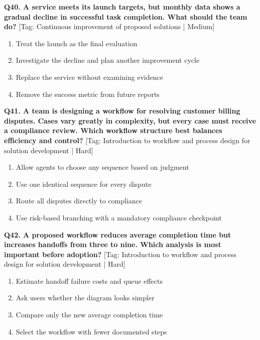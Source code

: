 \noindent\textbf{Q40. A service meets its launch targets, but monthly data shows a gradual decline in successful task completion. What should the team do?} \hfill [Tag: Continuous improvement of proposed solutions | Medium]
\begin{enumerate}[label=(\alph*),topsep=2pt,itemsep=1pt,partopsep=0pt,parsep=0pt]
    \item {Treat the launch as the final evaluation}
    \item {Investigate the decline and plan another improvement cycle}
    \item {Replace the service without examining evidence}
    \item {Remove the success metric from future reports}
\end{enumerate}
\vspace{2mm}

\noindent\textbf{Q41. A team is designing a workflow for resolving customer billing disputes. Cases vary greatly in complexity, but every case must receive a compliance review. Which workflow structure best balances efficiency and control?} \hfill [Tag: Introduction to workflow and process design for solution development | Hard]
\begin{enumerate}[label=(\alph*),topsep=2pt,itemsep=1pt,partopsep=0pt,parsep=0pt]
    \item {Allow agents to choose any sequence based on judgment}
    \item {Use one identical sequence for every dispute}
    \item {Route all disputes directly to compliance}
    \item {Use risk-based branching with a mandatory compliance checkpoint}
\end{enumerate}
\vspace{2mm}

\noindent\textbf{Q42. A proposed workflow reduces average completion time but increases handoffs from three to nine. Which analysis is most important before adoption?} \hfill [Tag: Introduction to workflow and process design for solution development | Hard]
\begin{enumerate}[label=(\alph*),topsep=2pt,itemsep=1pt,partopsep=0pt,parsep=0pt]
    \item {Estimate handoff failure costs and queue effects}
    \item {Ask users whether the diagram looks simpler}
    \item {Compare only the new average completion time}
    \item {Select the workflow with fewer documented steps}
\end{enumerate}
\vspace{2mm}

